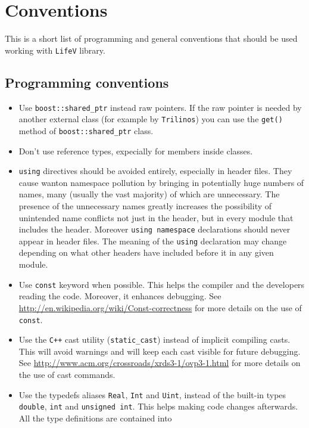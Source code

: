 \documentclass[a4paper]{article}
\begin{document}
\newpage
\section{Conventions}
This is a short list of programming and general conventions that should be used
working with \texttt{LifeV} library.

\subsection{Programming conventions}
\begin{itemize}
  \item Use \texttt{boost::shared\_ptr} instead raw pointers. If the raw
  pointer is needed by another external class (for example by \texttt{Trilinos})
  you can use the \texttt{get()} method of \texttt{boost::shared\_ptr} class.
  \item Don't use reference types, expecially for members inside classes.
  \item \texttt{using} directives should be avoided entirely, especially in
  header files. They cause wanton namespace pollution 
  by bringing in potentially huge numbers of names, many (usually the vast
  majority) of which are unnecessary. The presence of the unnecessary names
  greatly increases the possibility of unintended name conflicts not just in
  the header, but in every module that includes the header. Moreover
  \texttt{using namespace} declarations should never appear in header files.
  The meaning of the \texttt{using} declaration may change depending on what
  other headers have included before it in any given module.
  \item Use \texttt{const} keyword when possible. This helps the compiler
  and the developers reading the code. Moreover, it enhances
  debugging. See \url{http://en.wikipedia.org/wiki/Const-correctness} for more
  details on the use of \texttt{const}.
  \item Use the \texttt{C++} cast utility (\texttt{static\_cast}) instead of
  implicit compiling casts. This will avoid warnings and will keep
  each cast visible for future debugging. See
  \url{http://www.acm.org/crossroads/xrds3-1/ovp3-1.html} for more details on
  the use of cast commands.
  \item Use the typedefs aliases \texttt{Real}, \texttt{Int} and
  \texttt{Uint}, instead of the built-in types \texttt{double},
  \texttt{int} and \texttt{unsigned int}. This helps making code
  changes afterwards. All the type definitions are contained into

\end{itemize}
\end{document}

